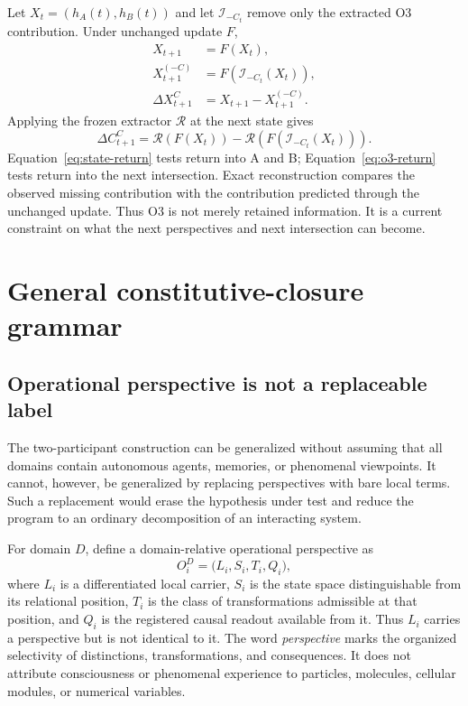 \documentclass[11pt,a4paper]{article}
\begin{document}
Let $X_t=(h_A(t),h_B(t))$ and let $\mathcal I_{-C_t}$ remove only the extracted O3 contribution. Under unchanged update $F$,
\begin{align}
 X_{t+1}&=F(X_t),\\
 X_{t+1}^{(-C)}&=F(\mathcal I_{-C_t}(X_t)),\\
 \Delta X_{t+1}^{C}&=X_{t+1}-X_{t+1}^{(-C)}.
 \label{eq:state-return}
\end{align}
Applying the frozen extractor $\mathcal R$ at the next state gives
\begin{equation}
 \Delta C_{t+1}^{C}
 =\mathcal R(F(X_t))-\mathcal R(F(\mathcal I_{-C_t}(X_t))).
 \label{eq:o3-return}
\end{equation}
Equation~\eqref{eq:state-return} tests return into A and B; Equation~\eqref{eq:o3-return} tests return into the next intersection. Exact reconstruction compares the observed missing contribution with the contribution predicted through the unchanged update. Thus O3 is not merely retained information. It is a current constraint on what the next perspectives and next intersection can become.

\section{General constitutive-closure grammar}

\subsection{Operational perspective is not a replaceable label}

The two-participant construction can be generalized without assuming that all domains contain autonomous agents, memories, or phenomenal viewpoints. It cannot, however, be generalized by replacing perspectives with bare local terms. Such a replacement would erase the hypothesis under test and reduce the program to an ordinary decomposition of an interacting system.

For domain $D$, define a domain-relative operational perspective as
\begin{equation}
 O_i^D=\bigl(L_i,S_i,T_i,Q_i\bigr),
 \label{eq:domain-perspective}
\end{equation}
where $L_i$ is a differentiated local carrier, $S_i$ is the state space distinguishable from its relational position, $T_i$ is the class of transformations admissible at that position, and $Q_i$ is the registered causal readout available from it. Thus $L_i$ carries a perspective but is not identical to it. The word \emph{perspective} marks the organized selectivity of distinctions, transformations, and consequences. It does not attribute consciousness or phenomenal experience to particles, molecules, cellular modules, or numerical variables.
\end{document}
